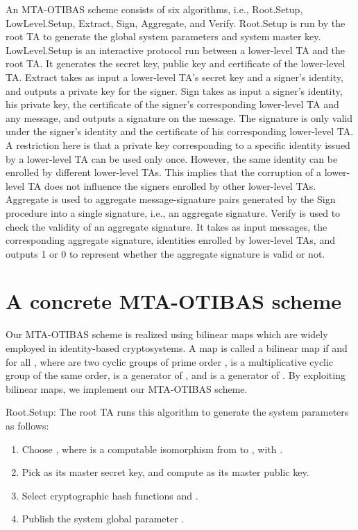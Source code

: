 \documentclass[10pt,journal,compsoc]{IEEEtran}
\begin{document}
An MTA-OTIBAS scheme consists of six
algorithms, i.e., {\sf Root.Setup}, {\sf LowLevel.Setup}, {\sf
Extract}, {\sf Sign}, {\sf Aggregate}, and {\sf Verify}. {\sf
Root.Setup} is run by the root TA to generate the global system
parameters and system master key. {\sf LowLevel.Setup} is an
interactive protocol run between a lower-level TA and the root TA.
It generates the secret key, public key and certificate of the
lower-level TA. {\sf Extract} takes as input a lower-level TA's
secret key and a signer's identity, and outputs a private key for
the signer. {\sf Sign} takes as input a signer's identity, his private
key, the certificate of the signer's corresponding lower-level TA
and any message, and outputs a signature on the message. The
signature is only valid under the signer's identity and the
certificate of his corresponding lower-level TA. A restriction
here is that a private key corresponding to a specific identity
issued by a lower-level TA can be used only once. However, the same
identity can be enrolled by different lower-level TAs. This implies
that the corruption of a lower-level TA does not influence the signers
enrolled by other lower-level TAs. {\sf Aggregate} is used to
aggregate  message-signature pairs generated by the {\sf Sign}
procedure into a single signature, i.e., an aggregate signature. {\sf
Verify} is used to check the validity of an aggregate signature. It
takes as input  messages, the corresponding aggregate signature,
 identities enrolled by  lower-level TAs, and outputs 1 or 0
to represent whether the aggregate signature is valid or not.


\section{A concrete MTA-OTIBAS scheme}
\label{specific}

Our MTA-OTIBAS scheme is
realized using bilinear
maps which are
widely employed in identity-based cryptosystems. A map
 is
called a bilinear map if  and
 for
all , where  are
two cyclic groups of prime order ,  is a
multiplicative cyclic group of the same order,  is a generator
of , and  is a generator of . By
exploiting bilinear maps, we implement our MTA-OTIBAS scheme.

\smallskip
{\sf Root.Setup}:
\smallskip
The root TA runs this algorithm to generate the system parameters as
follows:
\begin{enumerate}
  \item Choose ,
  where  is a computable isomorphism from
 to , with  \cite{Zhang10}.

  \item Pick  as its master secret key, and
compute  as its master public key.

  \item Select cryptographic hash functions    and .

  \item Publish the system global parameter
.
\end{enumerate}
\end{document}
